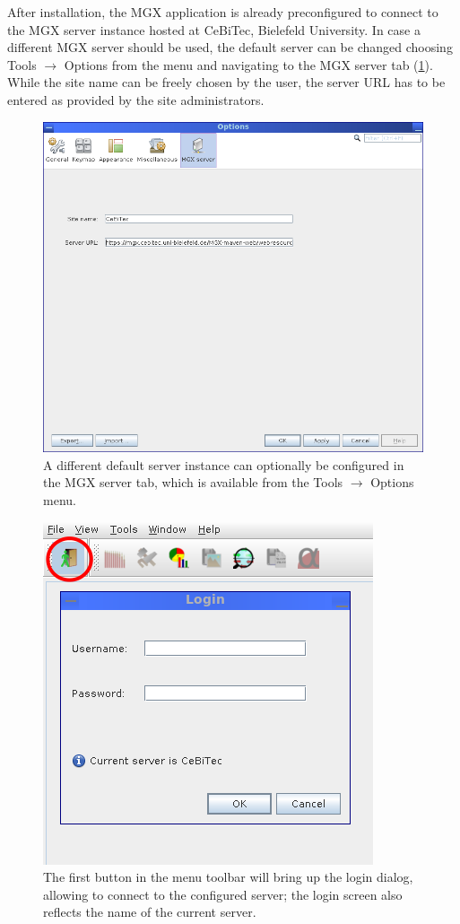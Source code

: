 After installation, the MGX application is already preconfigured to connect to the 
MGX server instance hosted at CeBiTec, Bielefeld University. In case a different MGX server
should be used, the default server can be changed choosing Tools $\rightarrow$ Options from the menu
and navigating to the MGX server tab (\ref{config-site}). While the site name can be freely
chosen by the user, the server URL has to be entered as provided by the site administrators.

\begin{figure}[H]
\centering
\includegraphics[width=.8\textwidth]{img/mgx/config-site}
\caption[Server configuration]{A different default server instance can optionally be configured in the MGX 
server tab, which is available from the Tools $\rightarrow$ Options menu.}
\label{config-site}
\end{figure}


\begin{figure}[H]
\centering
\includegraphics[width=.6\textwidth]{img/mgx/login}
\caption[Login screen]{The first button in the menu toolbar will bring up the login dialog, allowing to connect to the configured server; the login screen also reflects the name of the current server.}
\label{login-screen}
\end{figure}


